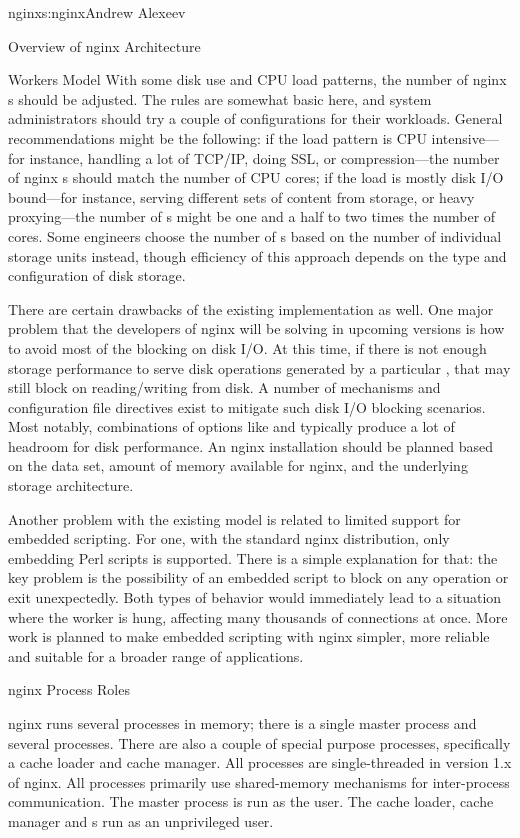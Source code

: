 \begin{aosachapter}{nginx}{s:nginx}{Andrew Alexeev}
\begin{aosasect1}{Overview of nginx Architecture}
\begin{aosasect2}{Workers Model}
With some disk use and CPU load patterns, the number of nginx
s should be adjusted. The rules are somewhat basic here,
and system administrators should try a couple of configurations for
their workloads. General recommendations might be the following: if
the load pattern is CPU intensive---for instance, handling a lot of
TCP/IP, doing SSL, or compression---the number of nginx s
should match the number of CPU cores; if the load is mostly disk I/O
bound---for instance, serving different sets of content from storage,
or heavy proxying---the number of s might be one and a half
to two times the number of cores. Some engineers choose the number of
s based on the number of individual storage units
instead, though efficiency of this approach depends on the type and
configuration of disk storage.

There are certain drawbacks of the existing implementation as
well. One major problem that the developers of nginx will be solving
in upcoming versions is how to avoid most of the blocking on disk
I/O. At this time, if there is not enough storage performance to serve
disk operations generated by a particular , that
 may still block on reading/writing from disk. A number
of mechanisms and configuration file directives exist to mitigate such
disk I/O blocking scenarios. Most notably, combinations of options
like  and  typically produce a lot of
headroom for disk performance. An nginx installation should be planned
based on the data set, amount of memory available for nginx, and the
underlying storage architecture.

Another problem with the existing  model is related to
limited support for embedded scripting. For one, with the standard
nginx distribution, only embedding Perl scripts is supported. There is
a simple explanation for that: the key problem is the
possibility of an embedded script to block on any
operation or exit unexpectedly. Both types of behavior would
immediately lead to a situation where the worker is hung, affecting
many thousands of connections at once. More work is planned to make
embedded scripting with nginx simpler, more reliable and suitable for
a broader range of applications.

\end{aosasect2}

\begin{aosasect2}{nginx Process Roles}

nginx runs several processes in memory; there is a single master
process and several  processes. There are also a couple
of special purpose processes, specifically a cache loader and cache
manager. All processes are single-threaded in version 1.x of
nginx. All processes primarily use shared-memory mechanisms for
inter-process communication. The master process is run as the
 user. The cache loader, cache manager and s
run as an unprivileged user.


\end{aosasect2}
\end{aosasect1}
\end{aosachapter}
